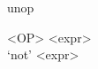 \documentclass[convert={outext=.png}]{standalone}
\begin{document}
\begin{málrit}{unop}
	\begin{stack}
		<OP> <expr>\\
		`not' <expr>
	\end{stack}
\end{málrit}
\end{document}
